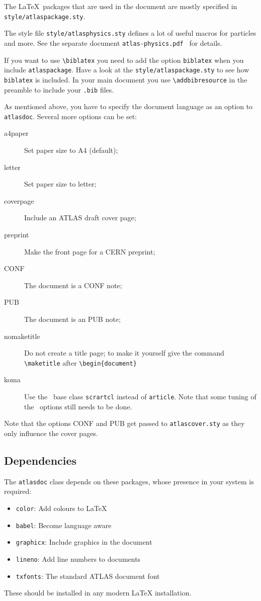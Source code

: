 \documentclass[koma,UKenglish]{style/atlasdoc}
\newcommand{\Macro}[1]{\texttt{\textbackslash #1}\xspace}
\newcommand{\Option}[1]{\textsf{#1}\xspace}
\newcommand{\Package}[1]{\texttt{#1}\xspace}
\begin{document}
The \LaTeX\ packages that are used in the document are mostly specified in 
\texttt{style/atlaspackage.sty}.

The style file \texttt{style/atlasphysics.sty} defines a lot of useful
macros for particles and more. See the separate document
\texttt{atlas-physics.pdf}~\cite{atlas-physics} for details.

If you want to use \Macro{biblatex} you need to add the option \texttt{biblatex} when you
include \texttt{atlaspackage}.
Have a look at the \texttt{style/atlaspackage.sty} to see how \texttt{biblatex} is included.
In your main document you use \Macro{addbibresource} in the preamble to include your \texttt{.bib} files.

As mentioned above, you have to specify the document language as an option to \Package{atlasdoc}.
Several more options can be set:
\begin{description}
\item[a4paper] Set paper size to A4 (default);
\item[letter] Set paper size to letter;
\item[coverpage] Include an ATLAS draft cover page;
\item[preprint] Make the front page for a CERN preprint;
\item[CONF] The document is a CONF note;
\item[PUB] The document is an PUB note;
\item[nomaketitle] Do not create a title page; to make it yourself give the command \Macro{maketitle} after
	\verb|\begin{document}|
\item[koma] Use the \KOMAScript\ base class \Package{scrartcl} instead of \Package{article}. 
	Note that some tuning of the \KOMAScript\ options still needs to be done.
\end{description}
Note that the options \Option{CONF} and \Option{PUB} get passed to \Package{atlascover.sty}
as they only influence the cover pages.

\subsection{Dependencies}

The \texttt{atlasdoc} class depends on these packages, whose presence in
your system is required:
\begin{itemize}\setlength{\parskip}{0pt}\setlength{\itemsep}{0pt}
\item \texttt{color}: Add colours to \LaTeX
\item \texttt{babel}: Become language aware
\item \texttt{graphicx}: Include graphics in the document
\item \texttt{lineno}: Add line numbers to documents
\item \texttt{txfonts}: The standard ATLAS document font
\end{itemize}
These should be installed in any modern \LaTeX{} installation.
\end{document}
